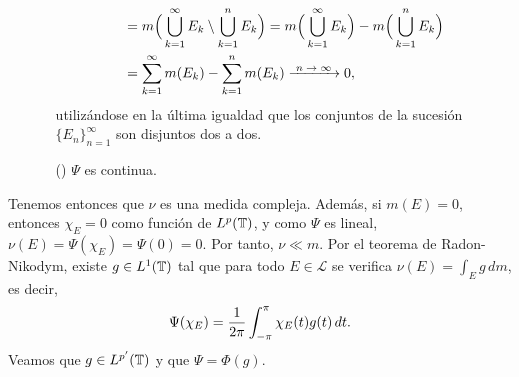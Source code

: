 \documentclass[a4paper, 12pt, oneside]{book}
\begin{document}
\begin{itemize}
\begin{itemize}
\[\begin{aligned}[t]
            &= m\Bigl(\, \bigcup_{k=1}^\infty E_k \setminus \bigcup_{k=1}^n E_k\Bigr) = m\Bigl(\,\bigcup_{k=1}^\infty E_k\Bigr) - m\Bigl(\,\bigcup_{k=1}^n E_k\Bigr) \\ &= \sum_{k=1}^\infty m(E_k) - \sum_{k=1}^n m(E_k) \nconv 0,
        \end{aligned}
        \]
        utilizándose en la última igualdad que los conjuntos de la sucesión $\{E_n\}_{n=1}^\infty$ son disjuntos dos a dos.
        \item[(\asts{3})] $\Psi$ es continua. 
    \end{itemize}
\end{itemize}

Tenemos entonces que $\nu$ es una medida compleja. Además, si $m(E) = 0$, entonces $\chi_E = 0$ como función de $L^p(\mathbb T)$, y como $\Psi$ es lineal, $\nu(E) = \Psi(\chi_E) = \Psi(0)= 0$. Por tanto, $\nu \ll m$. Por el teorema de Radon-Nikodym, existe $g \in L^1(\mathbb T)$ tal que para todo $E\in\mathcal{L}$ se verifica $\nu(E) =\int_E g\, dm$, es decir,
\[\Psi(\chi_E) = \frac{1}{2\pi}\int_{-\pi}^{\pi} \chi_E(t)g(t) \, dt.\]
Veamos que $g \in L^{p'}(\mathbb T)$ y que $\Psi = \Phi(g)$. 




\end{document}
